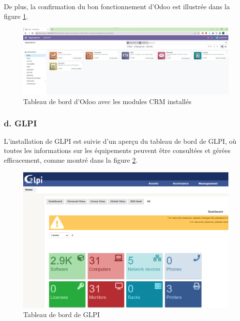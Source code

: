De plus, la confirmation du bon fonctionnement d'Odoo est illustrée dans la figure \ref{fig:odoo-dashboard}. 

\begin{figure}[H]
\centering
\includegraphics[width=15cm]{Images/OdooServer2.png}
\caption{Tableau de bord d'Odoo avec les modules CRM installés}
\label{fig:odoo-dashboard}
\end{figure}



\subsubsection{d. GLPI}

L'installation de GLPI \cite{glpi-install-tecmint} est suivie d'un aperçu du tableau de bord de GLPI, où toutes les informations sur les équipements peuvent être consultées et gérées efficacement, comme montré dans la figure \ref{fig:glpi-dashboard}.

\begin{figure}[H]
\centering
\includegraphics[width=15cm]{Images/GLPI.png}
\caption{Tableau de bord de GLPI}
\label{fig:glpi-dashboard}
\end{figure}





